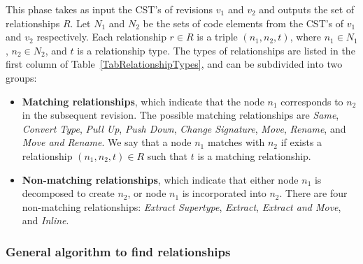 This phase takes as input the CST's of revisions $v_1$ and $v_2$ and outputs the set of relationships $R$. Let $N_1$ and $N_2$ be the sets of code elements from the CST's of $v_1$ and $v_2$ respectively. Each relationship $r \in R$ is a triple $(n_1, n_2, t)$, where $n_1 \in N_1$, $n_2 \in N_2$, and $t$ is a relationship type. The types of relationships are listed in the first column of Table~\ref{TabRelationshipTypes}, and can be subdivided into two groups:
\begin{itemize}
\item \textbf{Matching relationships}, which indicate that the node $n_1$ corresponds to $n_2$ in the subsequent revision.
The possible matching relationships are \textit{Same}, \textit{Convert Type}, \textit{Pull Up}, \textit{Push Down}, \textit{Change Signature}, \textit{Move}, \textit{Rename}, and \textit{Move and Rename}.
We say that a node $n_1$ matches with $n_2$ if exists a relationship $(n_1, n_2, t) \in R$ such that $t$ is a matching relationship.

\item \textbf{Non-matching relationships}, which indicate that either node $n_1$ is decomposed to create $n_2$, or node $n_1$ is incorporated into $n_2$.
There are four non-matching relationships: \textit{Extract Supertype}, \textit{Extract}, \textit{Extract and Move}, and \textit{Inline}.
\end{itemize}


\subsubsection{General algorithm to find relationships}

